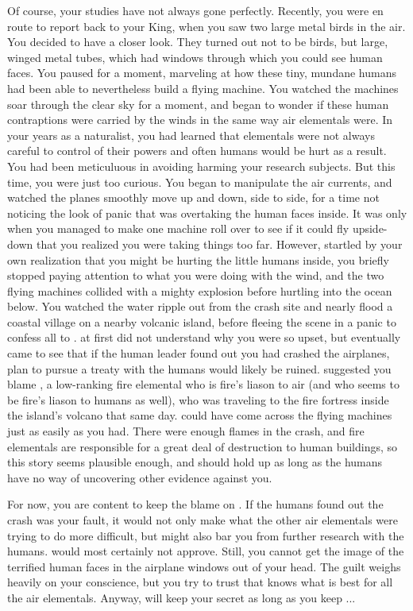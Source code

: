 \documentclass[char]{elementals}
\begin{document}
Of course, your studies have not always gone perfectly.  Recently, you were en route to report back to your King, when you saw two large metal birds in the air.  You decided to have a closer look.  They turned out not to be birds, but large, winged metal tubes, which had windows through which you could see human faces.  You paused for a moment, marveling at how these tiny, mundane humans had been able to nevertheless build a flying machine.  You watched the machines soar through the clear sky for a moment, and began to wonder if these human contraptions were carried by the winds in the same way air elementals were. In your years as a naturalist, you had learned that elementals were not always careful to control of their powers and often humans would be hurt as a result.  You had been meticuluous in avoiding harming your research subjects.  But this time, you were just too curious. You began to manipulate the air currents, and watched the planes smoothly move up and down, side to side, for a time not noticing the look of panic that was overtaking the human faces inside.  It was only when you managed to make one machine roll over to see if it could fly upside-down that you realized you were taking things too far.  However, startled by your own realization that you might be hurting the little humans inside, you briefly stopped paying attention to what you were doing with the wind, and the two flying machines collided with a mighty explosion before hurtling into the ocean below.  You watched the water ripple out from the crash site and nearly flood a coastal village on a nearby volcanic island, before fleeing the scene in a panic to confess all to \cKing{}.  \cKing{\They} at first did not understand why you were so upset, but eventually \cKing{\they} came to see that if the human leader found out you had crashed the airplanes, \cKing{\their} plan to pursue a treaty with the humans would likely be ruined.  \cKing{} suggested you blame \cJuliet{\intro}, a low-ranking fire elemental who is fire's liason to air (and who seems to be fire's liason to humans as well), who was traveling to the fire fortress inside the island's volcano that same day. \cJuliet{\They} could have come across the flying machines just as easily as you had.  There were enough flames in the crash, and fire elementals are responsible for a great deal of destruction to human buildings, so this story seems plausible enough, and should hold up as long as the humans have no way of uncovering other evidence against you.  

For now, you are content to keep the blame on \cJuliet{}.  If the humans found out the crash was your fault, it would not only make what the other air elementals were trying to do more difficult, but might also bar you from further research with the humans.  \cDiplomat{} would most certainly not approve.  Still, you cannot get the image of the terrified human faces in the airplane windows out of your head.  The guilt weighs heavily on your conscience, but you try to trust that \cKing{} knows what is best for all the air elementals. Anyway, \cKing{\they} will keep your secret as long as you keep \cKing{\their}...
\end{document}
